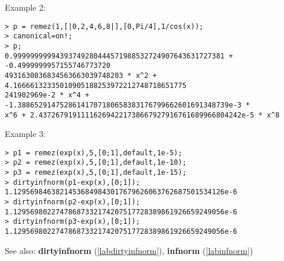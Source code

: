 \noindent Example 2: 
\begin{center}\begin{minipage}{15cm}\begin{Verbatim}[frame=single]
> p = remez(1,[|0,2,4,6,8|],[0,Pi/4],1/cos(x));
> canonical=on!;
> p;
0.99999999994393749280444571988532724907643631727381 + -0.4999999957155746773720
4931630836834563663039748203 * x^2 + 4.16666132335010905188253972212748718651775
241902969e-2 * x^4 + -1.38865291475286141707180658383176799662601691348739e-3 * 
x^6 + 2.437267919111162694221738667927916761689966804242e-5 * x^8
\end{Verbatim}
\end{minipage}\end{center}
\noindent Example 3: 
\begin{center}\begin{minipage}{15cm}\begin{Verbatim}[frame=single]
> p1 = remez(exp(x),5,[0;1],default,1e-5);
> p2 = remez(exp(x),5,[0;1],default,1e-10);
> p3 = remez(exp(x),5,[0;1],default,1e-15);
> dirtyinfnorm(p1-exp(x),[0;1]);
1.12956984638214536849843017679626063762687501534126e-6
> dirtyinfnorm(p2-exp(x),[0;1]);
1.12956980227478687332174207517728389861926659249056e-6
> dirtyinfnorm(p3-exp(x),[0;1]);
1.12956980227478687332174207517728389861926659249056e-6
\end{Verbatim}
\end{minipage}\end{center}
See also: \textbf{dirtyinfnorm} (\ref{labdirtyinfnorm}), \textbf{infnorm} (\ref{labinfnorm})
